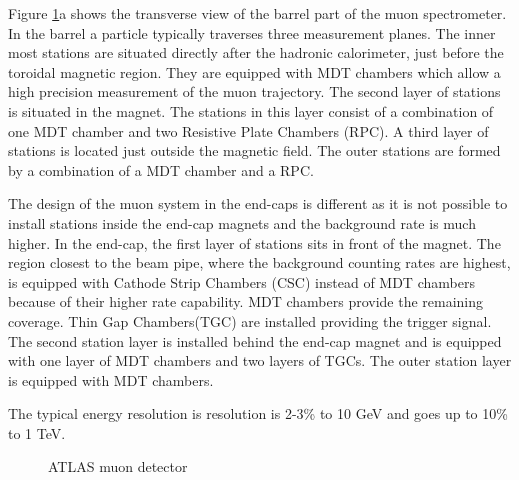 \documentclass[a4paper, oneside, 11pt, openright]{book}
\begin{document}
					Figure \ref{fig:ATLAS muon detector}a shows the transverse view of the barrel part of the muon spectrometer. In the barrel a particle typically traverses three measurement planes. The inner most stations are situated directly after the hadronic calorimeter, just before the toroidal magnetic region. They are equipped with MDT chambers which allow a high precision measurement of the muon trajectory. The second layer of stations is situated in the magnet. The stations in this layer consist of a combination of one MDT chamber and two Resistive Plate Chambers (RPC). A third layer of stations is located just outside the magnetic field. The outer stations are formed by a combination of a MDT chamber and a RPC.
					
					The design of the muon system in the end-caps is different as it is not possible to install stations inside the end-cap magnets and the background rate is much higher. In the end-cap, the first layer of stations sits in front of the magnet. The region closest to the beam pipe, where the background counting rates are highest, is equipped with Cathode Strip Chambers (CSC) instead of MDT chambers because of their higher rate capability. MDT chambers provide the remaining coverage. Thin Gap Chambers(TGC) are installed providing the trigger signal. The second station layer is installed behind the end-cap magnet and is equipped with one layer of MDT chambers and two layers of TGCs. The outer station layer is equipped with MDT chambers.
					
					The typical energy resolution is resolution is 2-3\% to 10 GeV and goes up to 10\% to 1 TeV.
					\begin{figure} [H]
						\centering
						 \quad
						\caption{ATLAS muon detector}
						\label{fig:ATLAS muon detector}
					\end{figure}
				
\end{document}
